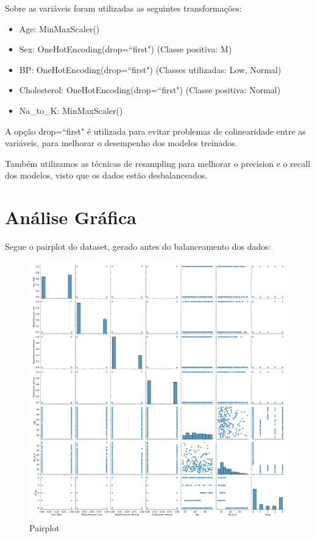 \documentclass[12pt,a4paper]{article}
\theoremstyle{definition}
\theoremstyle{theoremdd}
\begin{document}
Sobre as variáveis foram utilizadas as seguintes transformações:
\begin{itemize}
\item Age: MinMaxScaler()
\item Sex: OneHotEncoding(drop=``first") (Classe positiva: M)
\item BP: OneHotEncoding(drop=``first") (Classes utilizadas: Low, Normal)
\item Cholesterol: OneHotEncoding(drop=``first") (Classe positiva: Normal)
\item Na\_to\_K: MinMaxScaler()
\end{itemize}

A opção drop=``first" é utilizada para evitar problemas de colinearidade entre as variáveis, para melhorar o desempenho dos modelos treinados.

Também utilizamos as técnicas de resampling para  melhorar o precision e o recall dos modelos, visto que os dados estão desbalanceados.

\section{Análise Gráfica}

Segue o pairplot do dataset, gerado antes do balanceamento dos dados:
\begin{center}
\begin{figure}[H]
	\centering
	\includegraphics[height=\textwidth,width=\textwidth]{pairplot_dataset.pdf}
	\caption{Pairplot}
	\label{fig:01}
\end{figure}
\end{center}
\end{document}
